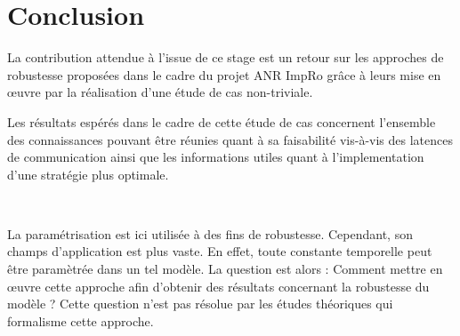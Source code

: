   \section*{Conclusion}

    La contribution attendue à l'issue de ce stage est un retour sur les
    approches de robustesse proposées dans le cadre du projet ANR ImpRo grâce à
    leurs mise en \oe uvre par la réalisation d'une étude de cas non-triviale.
    
    Les résultats espérés dans le cadre de cette étude de cas concernent
    l'ensemble des connaissances pouvant être réunies quant à sa faisabilité
    vis-à-vis des latences de communication ainsi que les informations utiles
    quant à l'implementation d'une stratégie plus optimale.

    ~


    La paramétrisation est ici utilisée à des fins de robustesse. Cependant, son
    champs d'application est plus vaste. En effet, toute constante temporelle
    peut être paramètrée dans un tel modèle. La question est alors : Comment
    mettre en \oe uvre cette approche afin d'obtenir des résultats concernant la
    robustesse du modèle ? Cette question n'est pas résolue par les études
    théoriques qui formalisme cette approche.




